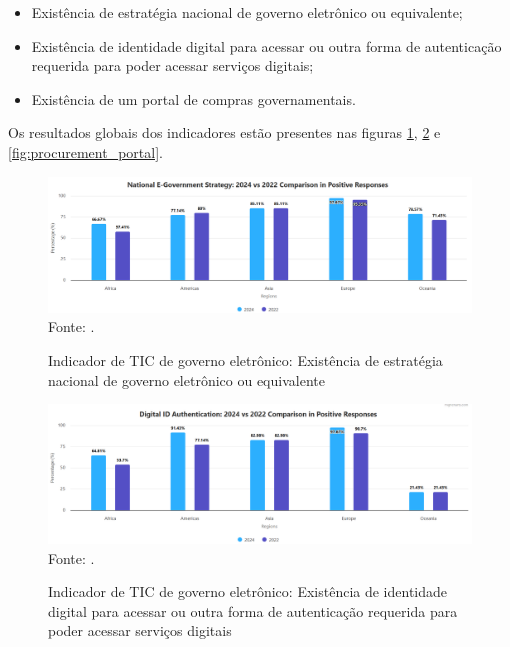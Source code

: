 \begin{itemize}
	\item Existência de estratégia nacional de governo eletrônico ou equivalente;
	\item Existência de identidade digital para acessar ou outra forma de autenticação requerida para poder acessar serviços digitais;
	\item Existência de um portal de compras governamentais.
\end{itemize}

Os resultados globais dos indicadores estão presentes nas figuras \ref{fig:national_government_strategy}, \ref{fig:national_identity} e \ref{fig:procurement_portal}.

\begin{figure}[H]
	\centering
	\caption{Indicador de TIC de governo eletrônico: Existência de estratégia nacional de governo eletrônico ou equivalente}
	\includegraphics[width=1\linewidth]{figuras/national_government_strategy}
	\label{fig:national_government_strategy}
	\footnotesize{Fonte: \cite{ONU_ICT_in_government_indicators}.}
\end{figure}

\begin{figure}[H]
	\centering
	\caption{Indicador de TIC de governo eletrônico: Existência de identidade digital para acessar ou outra forma de autenticação requerida para poder acessar serviços digitais}
	\includegraphics[width=1\linewidth]{figuras/digital_identity}
	\label{fig:national_identity}
	\footnotesize{Fonte: \cite{ONU_ICT_in_government_indicators}.}
\end{figure}


